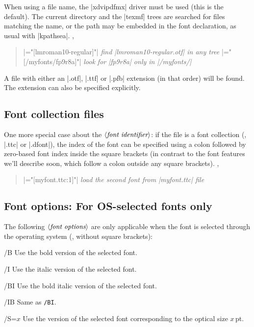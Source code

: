 \documentclass[12pt]{article}
\newenvironment{optdesc}
  {\begin{description}[font=\ttfamily,style=nextline,leftmargin=1.5cm]}
  {\end{description}}
\newcommand\xarg[1]{$\langle\hbox{\rmfamily\itshape #1}\rangle$}
\let\latin\relax %
\def\eg{\latin{e.g.}}
\def\ie{\latin{i.e.}}
\def\Eg{\latin{E.g.}}
\begin{document}
When using a file name, the |xdvipdfmx| driver must be used (this is the
default). The current directory and the |texmf| trees are searched for
files matching the name, or the path may be embedded in the font
declaration, as usual with |kpathsea|. \Eg,
\begin{quote}\small
|\font\1="[lmroman10-regular]"| \hfill
  {\em find |lmroman10-regular.otf| in any tree}
|\font\2="[/myfonts/fp9r8a]"| \hfill
  {\em look for |fp9r8a| only in |/myfonts/|}
\end{quote}

A file with either an |.otf|, |.ttf| or |.pfb| extension (in that order) will be found.  The
extension can also be specified explicitly.

\subsection{Font collection files}

One more special case about the \xarg{font identifier}: if the file is a
font collection (\eg, |.ttc| or |.dfont|), the index of the font can be
specified using a colon followed by zero-based font index inside the
square brackets (in contrast to the font features we'll describe soon,
which follow a colon outside any square brackets). \Eg,
\begin{quote}\small
|\font\2="[myfont.ttc:1]"| \hfill {\em load the second font from |myfont.ttc| file}
\end{quote}


\subsection{Font options: For OS-selected fonts only}

The following \xarg{font options} are only applicable when the font is selected
through the operating system (\ie, without square brackets):
\begin{optdesc}
\item[/B] Use the bold version of the selected font.
\item[/I] Use the italic version of the selected font.
\item[/BI] Use the bold italic version of the selected font.
\item[/IB] Same as \texttt{/BI}.
\item[/S=$x$] Use the version of the selected font corresponding to the
optical size $x$\,pt.
\end{optdesc}
\end{document}

